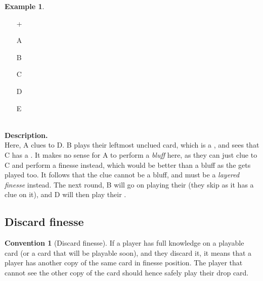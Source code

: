 \documentclass[a4paper]{article}
\theoremstyle{plain}
\theoremstyle{definition}
\newtheorem{example}[theorem]{Example}
\newtheorem{convention}[theorem]{Convention}
\begin{document}
\begin{example}	\hfill \\
	\begin{minipage}{0.45\textwidth}
		\begin{itemize}
			\item[\Large +]      
			\item[\Large A]    
			\item[\Large B]    
			\item[\Large C]    
			\item[\Large D]    
			\item[\Large E]    
		\end{itemize}
	\end{minipage}%
	\begin{minipage}{0.55\textwidth}
		\hfill \\
		
		\textbf{Description.} \\
		
		Here, A clues  to D. B plays their leftmost unclued card, which is a , and sees that C has a . It makes no sense for A to perform a \textit{bluff} here, as they can just clue  to C and perform a finesse instead, which would be better than a bluff as the  gets played too. It follows that the  clue cannot be a bluff, and must be a \emph{layered finesse} instead. The next round, B will go on playing their  (they skip  as it has a  clue on it), and D will then play their .
	\end{minipage}
\end{example} \vspace{0.15 cm}

\subsection{Discard finesse}

\begin{convention}[Discard finesse]
	If a player has full knowledge on a playable card (or a card that will be playable soon), and they discard it, it means that a player has another copy of the same card in finesse position. The player that cannot see the other copy of the card should hence safely play their drop card.
\end{convention}
\end{document}
